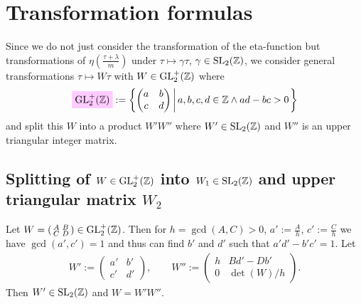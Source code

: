 \documentclass{article}
\begin{document}
\section{Transformation formulas}

Since we do not just consider the transformation of the eta-function
but transformations of $\eta\left(\frac{\tau+\lambda}{m}\right)$ under
$\tau\mapsto\gamma\tau$, $\gamma\in\SL2Z$, we consider general
transformations $\tau\mapsto W\tau$ with
$W \in \mathrm{GL}_2^+(\mathbb{Z})$ where
\begin{gather}
  \defineNotation[GL2+Z]{\mathrm{GL}_2^+(\setZ)}
  :=
  \SetDef{  \begin{pmatrix}
    a & b\\
    c & d
  \end{pmatrix}}{a,b,c,d\in\setZ \land ad-bc>0}
  \label{eq:GL2+Z}
\end{gather}
and split this $W$ into a product $W' W''$ where $W'\in\SL2Z$ and
$W''$ is an upper triangular integer matrix.


\subsection{Splitting of $W \in \mathrm{GL}_2^+(\mathbb{Z})$ into
  $W_1\in \SL2Z$ and upper triangular matrix $W_2$}

\begin{Lemma}
  \label{thm:W-splitting}
  Let
  $W=\left(\begin{smallmatrix}A&B\\C&D\end{smallmatrix}\right) \in
  \mathrm{GL}_2^+(\mathbb{Z})$.
  Then for $h=\gcd(A, C)>0$, $a':=\frac{A}{h}$, $c':=\frac{C}{h}$ we
  have $\gcd(a', c')=1$ and thus can find $b'$ and $d'$ such that
  $a'd'-b'c'=1$.
  Let
  \begin{gather*}
    W':=\begin{pmatrix}a'&b'\\c'&d'\end{pmatrix},
    \qquad
    W''
    :=
    \begin{pmatrix}
      h &B d'-D b'\\
      0 & \det(W) / h
    \end{pmatrix}.
  \end{gather*}
  Then $W'\in \SL2Z$ and $W = W' W''$.
\end{Lemma}
\end{document}
